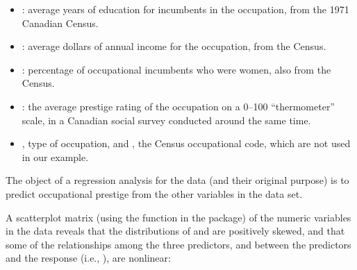 \documentclass[
]{jss}
\providecommand{\tightlist}{%
  \setlength{\itemsep}{0pt}\setlength{\parskip}{0pt}}
\begin{document}
\begin{itemize}
\tightlist
\item
  : average years of education for incumbents in the
  occupation, from the 1971 Canadian Census.
\item
  : average dollars of annual income for the occupation,
  from the Census.
\item
  : percentage of occupational incumbents who were women,
  also from the Census.
\item
  : the average prestige rating of the occupation on a
  0--100 ``thermometer'' scale, in a Canadian social survey conducted
  around the same time.
\item
  , type of occupation, and , the Census
  occupational code, which are not used in our example.
\end{itemize}

The object of a regression analysis for the  data (and
their original purpose) is to predict occupational prestige from the
other variables in the data set.

A scatterplot matrix (using the  function in
the  package) of the numeric variables in the data reveals that
the distributions of  and  are positively
skewed, and that some of the relationships among the three predictors,
and between the predictors and the response (i.e., ), are
nonlinear:
\end{document}
